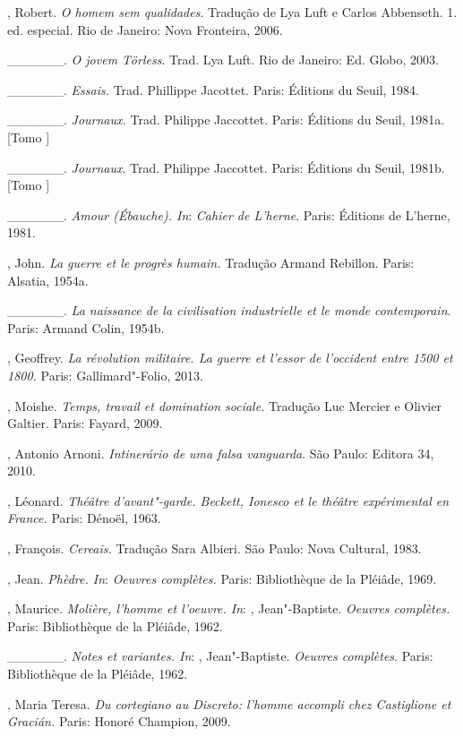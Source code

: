 \begin{Parskip}
, Robert. \emph{O homem sem qualidades}. Tradução de Lya Luft e
Carlos Abbenseth. 1. ed. especial. Rio de Janeiro: Nova Fronteira, 2006.

\_\_\_\_\_\_. \emph{O jovem Törless}. Trad. Lya Luft. Rio de Janeiro:
Ed. Globo, 2003.

\_\_\_\_\_\_. \emph{Essais.} Trad. Phillippe Jacottet. Paris: Éditions
du Seuil, 1984.

\_\_\_\_\_\_. \emph{Journaux.} Trad. Philippe Jaccottet. Paris:
Éditions du Seuil, 1981a. [Tomo ]

\_\_\_\_\_\_. \emph{Journaux}. Trad. Philippe Jaccottet. Paris:
Éditions du Seuil, 1981b. [Tomo ]

\_\_\_\_\_\_. \emph{Amour (Ébauche). In}: \emph{Cahier de L'herne}.
Paris: Éditions de L'herne, 1981.

, John. \emph{La guerre et le progrès humain.} Tradução Armand
Rebillon. Paris: Alsatia, 1954a.

\_\_\_\_\_\_. \emph{La naissance de la civilisation industrielle et le
monde contemporain}. Paris: Armand Colin, 1954b.

, Geoffrey. \emph{La révolution militaire. La guerre et l'essor
de l'occident entre 1500 et 1800.} Paris: Gallimard"-Folio, 2013.

, Moishe. \emph{Temps, travail et domination sociale.} Tradução
Luc Mercier e Olivier Galtier. Paris: Fayard, 2009.

, Antonio Arnoni. \emph{Intinerário de uma falsa vanguarda}. São Paulo:
Editora 34, 2010.

, Léonard. \emph{Théâtre d'avant"-garde. Beckett, Ionesco et
le théâtre expérimental en France.} Paris: Dénoël, 1963.

, François. \emph{Cereais.} Tradução Sara Albieri. São Paulo:
Nova Cultural, 1983.

, Jean. \emph{Phèdre. In}: \emph{Oeuvres complètes.} Paris:
Bibliothèque de la Pléiâde, 1969.

, Maurice. \emph{Molière, l'homme et l'oeuvre. In}: ,
Jean"-Baptiste. \emph{Oeuvres complètes.} Paris: Bibliothèque de la
Pléiâde, 1962.

\_\_\_\_\_\_. \emph{Notes et variantes. In}: ,
Jean"-Baptiste. \emph{Oeuvres complètes}. Paris: Bibliothèque de la Pléiâde, 1962.

, Maria Teresa. \emph{Du cortegiano au Discreto: l'homme accompli
chez Castiglione et Gracián.} Paris: Honoré Champion, 2009.


\end{Parskip}
